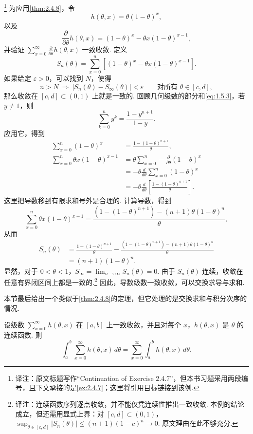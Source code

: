 \begin{example}[续\autoref{ex:2.4.7}]\label{ex:2.4.9}
\footnote{译注：原文标题写作“Continuation of Exercise 2.4.7”，但本书习题采用两段编号，且下文承接的是\autoref{ex:2.4.7}；这里将引用目标链接到该例.}
为应用\autoref{thm:2.4.8}，令
$$h(\theta,x)=\theta(1-\theta)^x,$$
以及
$$\frac\partial{\partial\theta}h(\theta,x)=(1-\theta)^x-\theta x(1-\theta)^{x-1},$$
并验证 $\sum_{x=0}^\infty\frac\partial{\partial\theta}h(\theta,x)$ 一致收敛. 定义
$$S_n(\theta)=\sum_{x=0}^n[(1-\theta)^x-\theta x(1-\theta)^{x-1}].$$
如果给定 $\varepsilon>0$，可以找到 $N$，使得
$$n>N\ \Longrightarrow\ |S_n(\theta)-S_\infty(\theta)|<\varepsilon
\qquad\text{对所有 $\theta\in[c,d]$},$$
那么收敛在 $[c,d]\subset(0,1)$ 上就是一致的. 回顾几何级数的部分和\eqref{eq:1.5.3}，若 $y\ne1$，则
$$\sum_{k=0}^n y^k=\frac{1-y^{n+1}}{1-y}.$$
应用它，得到
$$\begin{aligned}
\sum_{x=0}^n(1-\theta)^x&=\frac{1-(1-\theta)^{n+1}}\theta,\\
\sum_{x=0}^n\theta x(1-\theta)^{x-1}
&=\theta\sum_{x=0}^n-\frac\partial{\partial\theta}(1-\theta)^x\\
&=-\theta\frac d{d\theta}\sum_{x=0}^n(1-\theta)^x\\
&=-\theta\frac d{d\theta}\left[\frac{1-(1-\theta)^{n+1}}\theta\right].
\end{aligned}$$
这里把导数移到有限求和号外是合理的. 计算导数，得到
$$\sum_{x=0}^n\theta x(1-\theta)^{x-1}
=\frac{(1-(1-\theta)^{n+1})-(n+1)\theta(1-\theta)^n}\theta,$$
从而
$$\begin{aligned}
S_n(\theta)&=\frac{1-(1-\theta)^{n+1}}\theta
-\frac{(1-(1-\theta)^{n+1})-(n+1)\theta(1-\theta)^n}\theta\\
&=(n+1)(1-\theta)^n.
\end{aligned}$$
显然，对于 $0<\theta<1$，$S_\infty=\lim_{n\to\infty}S_n(\theta)=0$. 由于 $S_n(\theta)$ 连续，收敛在任意有界闭区间上都是一致的.\footnote{译注：连续函数序列逐点收敛，并不能仅凭连续性推出一致收敛. 本例的结论成立，但还需用显式上界：对 $[c,d]\subset(0,1)$，$\sup_{\theta\in[c,d]}|S_n(\theta)|\le(n+1)(1-c)^n\to0$. 原文理由在此不够充分.} 因此，导数级数一致收敛，可以交换求导与求和.
\end{example}

本节最后给出一个类似于\autoref{thm:2.4.8}的定理，但它处理的是交换求和与积分次序的情况.
\begin{theorem}\label{thm:2.4.10}
设级数 $\sum_{x=0}^\infty h(\theta,x)$ 在 $[a,b]$ 上一致收敛，并且对每个 $x$，$h(\theta,x)$ 是 $\theta$ 的连续函数. 则
$$\int_a^b\sum_{x=0}^\infty h(\theta,x)\,d\theta
=\sum_{x=0}^\infty\int_a^b h(\theta,x)\,d\theta.$$
\end{theorem}
